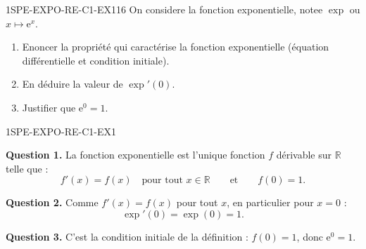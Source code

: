 


\begin{exercice}{1SPE-EXPO-RE-C1-EX1}{1}{6}
On considere la fonction exponentielle, notee $\exp$ ou $x \mapsto \mathrm{e}^x$.
\begin{enumerate}
  \item Enoncer la propriété qui caractérise la fonction exponentielle (équation différentielle et condition initiale).
  \item En déduire la valeur de $\exp'(0)$.
  \item Justifier que $\mathrm{e}^0 = 1$.
\end{enumerate}
\end{exercice}


\begin{corrige}{1SPE-EXPO-RE-C1-EX1}


\textbf{Question 1.} La fonction exponentielle est l'unique fonction $f$ dérivable sur $\mathbb{R}$ telle que :
\[
f'(x) = f(x) \quad \text{pour tout } x \in \mathbb{R} \qquad \text{et} \qquad f(0) = 1.
\]

\textbf{Question 2.} Comme $f'(x) = f(x)$ pour tout $x$, en particulier pour $x = 0$ :
\[
\exp'(0) = \exp(0) = 1.
\]

\textbf{Question 3.} C'est la condition initiale de la définition : $f(0) = 1$, donc $\mathrm{e}^0 = 1$.

\end{corrige}

